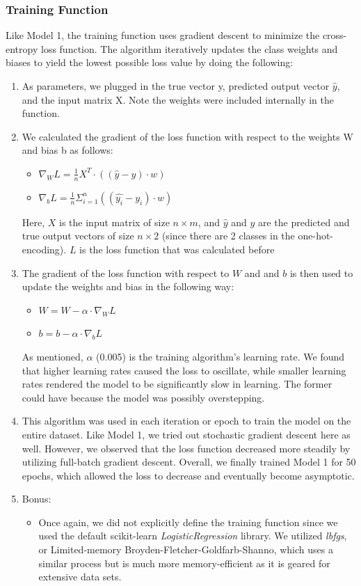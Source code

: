 \documentclass[11pt]{article}
\begin{document}
\subsubsection{Training Function}
Like Model 1, the training function uses gradient descent to minimize the cross-entropy loss function. The algorithm iteratively updates the class weights and biases to yield the lowest possible loss value by doing the following: 
\begin{enumerate}
    \item As parameters, we plugged in the true vector y, predicted output vector $\hat{y}$, and the input matrix X. Note the weights were included internally in the function. 
    \item We calculated the gradient of the loss function with respect to the weights W and bias b as follows:
    \begin{itemize}
        \item $\nabla_{W} L = \frac{1}{n} X^{T} \cdot ((\hat{y} - y) \cdot w)$
        \item $\nabla_{b} L = \frac{1}{n} \Sigma_{i=1}^{n} ((\hat{y_i} - y_i) \cdot w)$
    \end{itemize}
    Here, $X$ is the input matrix of size $n \times m$, and $\hat{y}$ and $y$ are the predicted and true output vectors of size $n \times 2$ (since there are 2 classes in the one-hot-encoding). $L$ is the loss function that was calculated before
    \item The gradient of the loss function with respect to $W$ and and $b$ is then used to update the weights and bias in the following way:
    \begin{itemize}
        \item $W = W - \alpha \cdot \nabla_{W} L$
        \item $b = b - \alpha \cdot \nabla_{b} L$
    \end{itemize}
    As mentioned, $\alpha$ (0.005) is the training algorithm's learning rate. We found that higher learning rates caused the loss to oscillate, while smaller learning rates rendered the model to be significantly slow in learning.  The former could have because the model was possibly overstepping. 
    \item This algorithm was used in each iteration or epoch to train the model on the entire dataset. Like Model 1, we tried out stochastic gradient descent here as well. However, we observed that the loss function decreased more steadily by utilizing full-batch gradient descent. Overall, we finally trained Model 1 for 50 epochs, which allowed the loss to decrease and eventually become asymptotic. 
    \item Bonus:
    \begin{itemize}
        \item Once again, we did not explicitly define the training function since we used the default scikit-learn \emph{LogisticRegression} library. We utilized \emph{lbfgs}, or Limited-memory Broyden-Fletcher-Goldfarb-Shanno, which uses a similar process but is much more memory-efficient as it is geared for extensive data sets. 
    \end{itemize}
\end{enumerate}
\end{document}
